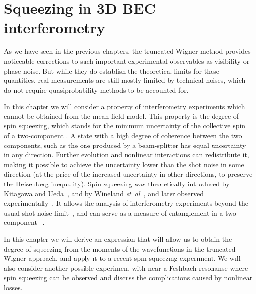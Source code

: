 \chapter{Squeezing in 3D BEC interferometry}
\label{cha:bec-squeezing}

As we have seen in the previous chapters, the truncated Wigner method provides noticeable corrections to such important experimental observables as visibility or phase noise.
But while they do establish the theoretical limits for these quantities, real measurements are still mostly limited by technical noises, which do not require quasiprobability methods to be accounted for.

In this chapter we will consider a property of  interferometry experiments which cannot be obtained from the mean-field model.
This property is the degree of spin squeezing, which stands for the minimum uncertainty of the collective spin of a two-component .
A state with a high degree of coherence between the two components, such as the one produced by a beam-splitter has equal uncertainty in any direction.
Further evolution and nonlinear interactions can redistribute it, making it possible to achieve the uncertainty lower than the shot noise in some direction (at the price of the increased uncertainty in other directions, to preserve the Heisenberg inequality).
Spin squeezing was theoretically introduced by Kitagawa and Ueda~\cite{Kitagawa1993}, and by Wineland \textit{et~al}~\cite{Wineland1994}, and later observed experimentally~\cite{Hald1999,Kuzmich2000}.
It allows the analysis of interferometry experiments beyond the usual shot noise limit~\cite{Riedel2010,Gross2010}, and can serve as a measure of entanglement in a two-component ~\cite{Sorensen2001}.

In this chapter we will derive an expression that will allow us to obtain the degree of squeezing from the moments of the wavefunctions in the truncated Wigner approach, and apply it to a recent spin squeezing experiment.
We will also consider another possible experiment with  near a Feshbach resonanse where spin squeezing can be observed and discuss the complications caused by nonlinear losses.







